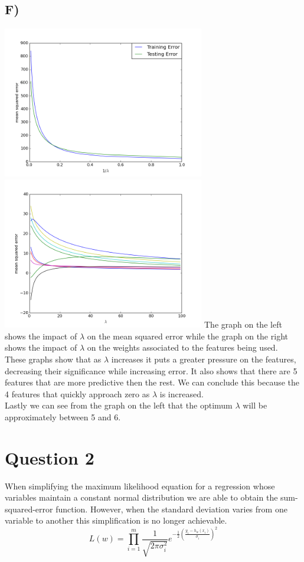 \documentclass{report}
\begin{document}
\subsection*{F)}
\includegraphics[width=250pt, keepaspectratio=true]{error.png}
\includegraphics[width=250pt, keepaspectratio=true]{weights.png}
The graph on the left shows the impact of $\lambda$ on the mean squared error while
the graph on the right shows the impact of $\lambda$ on the weights associated to
the features being used.\\

These graphs show that as $\lambda$ increases it puts a greater pressure on the
features, decreasing their significance while increasing error. It also shows that
there are 5 features that are more predictive then the rest. We can conclude this
because the 4 features that quickly approach zero as $\lambda$ is increased.\\

Lastly we can see from the graph on the left that the optimum $\lambda$ will be
approximately between 5 and 6.
\section*{Question 2}
When simplifying the maximum likelihood equation for a regression whose variables
maintain a constant normal distribution we are able to obtain the sum-squared-error
function. However, when the standard deviation varies from one variable to another
this simplification is no longer achievable.
  \begin{equation}
     L(w) = \prod_{i=1}^{m} \frac{1}{\sqrt{2\pi\sigma_i^2}}e ^ {-\frac{1}{2}\left(\frac{y_i-h_w(x_i)}{\sigma_i}\right)^2}
  \end{equation}
\end{document}
